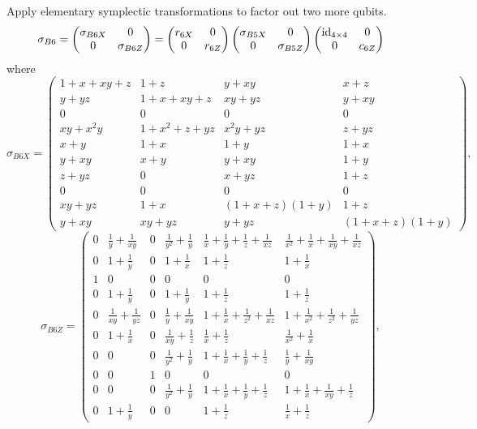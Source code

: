 Apply elementary symplectic transformations to factor out two more qubits.
\[
\sigma_{B6} =
 \begin{pmatrix} \sigma_{B6X} & 0 \\ 0 & \sigma_{B6Z} \end{pmatrix}
=
\begin{pmatrix} r_{6X} & 0 \\ 0 & r_{6Z} \end{pmatrix}
\begin{pmatrix} \sigma_{B5X} & 0 \\ 0 & \sigma_{B5Z} \end{pmatrix}
\begin{pmatrix} \mathrm{id}_{4 \times 4} & 0 \\ 0 & c_{6Z} \end{pmatrix}
\]
where
\[
 \sigma_{B6X} =
\left(\begin{array}{cccc}
 1+x+x y+z & 1+z & y+x y & x+z \\
 y+y z & 1+x+x y+z & x y+y z & y+x y \\
\hline
 0 & 0 & 0 & 0 \\
\hline
 x y+x^2 y & 1+x^2+z+y z & x^2 y+y z & z+y z \\
 x+y & 1+x & 1+y & 1+x \\
 y+x y & x+y & y+x y & 1+y \\
 z+y z & 0 & x+y z & 1+z \\
\hline
 0 & 0 & 0 & 0 \\
\hline
 x y+y z & 1+x & (1+x+z)(1+y) & 1+z \\
 y+x y & x y+y z & y+y z & (1+x+z)(1+y) %
\end{array}\right),
\]
\[
 \sigma_{B6Z} =
\left(\begin{array}{c|c|c|ccc}
 0 & \frac{1}{y}+\frac{1}{x y} & 0 & \frac{1}{y^2}+\frac{1}{y} & \frac{1}{x}+\frac{1}{y}+\frac{1}{z}+\frac{1}{x z} & \frac{1}{x^2}+\frac{1}{x}+\frac{1}{x y}+\frac{1}{x z} \\
 0 & 1+\frac{1}{y} & 0 & 1+\frac{1}{x} & 1+\frac{1}{z} & 1+\frac{1}{x} \\
\hline
 1 & 0 & 0 & 0 & 0 & 0 \\
\hline
 0 & 1+\frac{1}{y} & 0 & 1+\frac{1}{y} & 1+\frac{1}{z} & 1+\frac{1}{z} \\
 0 & \frac{1}{x y}+\frac{1}{y z} & 0 & \frac{1}{y}+\frac{1}{x y} & 1+\frac{1}{x}+\frac{1}{z^2}+\frac{1}{x z} & 1+\frac{1}{x^2}+\frac{1}{z^2}+\frac{1}{y z} \\
 0 & 1+\frac{1}{x} & 0 & \frac{1}{x y}+\frac{1}{z} & \frac{1}{x}+\frac{1}{z} & \frac{1}{x^2}+\frac{1}{x} \\
 0 & 0 & 0 & \frac{1}{y^2}+\frac{1}{y} & 1+\frac{1}{x}+\frac{1}{y}+\frac{1}{z} & \frac{1}{y}+\frac{1}{x y} \\
\hline
 0 & 0 & 1 & 0 & 0 & 0 \\
\hline
 0 & 0 & 0 & \frac{1}{y^2}+\frac{1}{y} & 1+\frac{1}{x}+\frac{1}{y}+\frac{1}{z} & 1+\frac{1}{x}+\frac{1}{x y}+\frac{1}{z} \\
 0 & 1+\frac{1}{y} & 0 & 0 & 1+\frac{1}{z} & \frac{1}{x}+\frac{1}{z}
\end{array}\right),
\]
